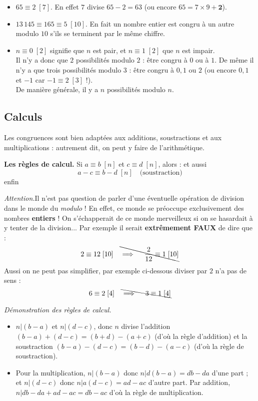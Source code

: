 \documentclass[11pt,class=report,crop=false]{standalone}
\begin{document}
\begin{itemize}
        \item $ 65 \equiv 2 \; [7]$. En effet $7$ divise $65-2=63$ (ou encore $65=7\times9+\boldsymbol{2}$).
        
        \item $ 13\,145 \equiv 165 \equiv 5 \; [10]$. En fait un nombre entier est congru à un autre modulo $10$ s'ils se terminent par le même chiffre.
        
        \item $n\equiv 0 \; [2]$ signifie que $n$ est pair, et $n\equiv 1 \; [2]$ que $n$ est impair.\\
        Il n'y a donc que $2$ possibilités modulo $2$ : être congru à $0$ ou à $1$. De même il n'y a que trois possibilités modulo $3$ : être congru à $0,1$ ou $2$ (ou encore $0,1$ et $-1$ car $-1\equiv 2 \;[3]$ !).\\ De manière générale, il y a $n$ possibilités modulo $n$.
\end{itemize}


\subsection*{Calculs}


Les congruences sont bien adaptées aux additions, soustractions et aux multiplications : autrement dit, on peut y faire de l'arithmétique.

\medskip

\textbf{Les règles de calcul.}
Si $a \equiv b \; [n]$ et $c \equiv d \; [n]$, alors :
et aussi    
$$a-c \equiv b-d  \; [n] \quad  \text{(soustraction)}$$
enfin

\emph{Attention.}Il n'est pas question de parler d'une éventuelle opération de division dans le monde du \textit{modulo} ! En effet, ce monde se préoccupe exclusivement des nombres \textbf{entiers} ! On s'échapperait de ce monde merveilleux si on se hasardait à y tenter de la division... Par exemple il serait \textbf{extrêmement FAUX} de dire que :
$$  2 \equiv 12 \; [10] \quad \bcancel{\implies \quad \frac{2}{12} \equiv 1 \; [10]  } $$  
Aussi on ne peut pas simplifier, par exemple ci-dessous diviser par $2$ n'a pas de sens :
$$  6 \equiv 2 \; [4]  \quad \bcancel{\implies \quad 3 \equiv 1 \; [4]  } $$


\emph{Démonstration des règles de calcul.}
\begin{itemize}
    \item $n|(b-a)$ et $n|(d-c)$, donc $n$ divise l'addition $(b-a)+(d-c)=(b+d)-(a+c)$ (d'où la règle d'addition) et la soustraction $(b-a)-(d-c)=(b-d)-(a-c)$ (d'où la règle de soustraction).
    
    \item Pour la multiplication, $n|(b-a)$ donc $n|d(b-a)=db-da$ d'une part ;
     et $n|(d-c)$ donc $n|a(d-c)=ad-ac$ d'autre part. Par addition, $n|db-da+ad-ac=db-ac$ d'où la règle de multiplication.
\end{itemize} 
\end{document}
